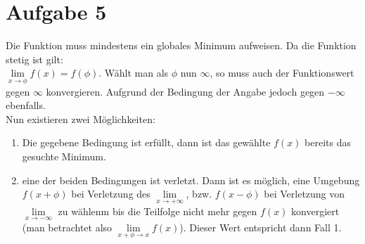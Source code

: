 \documentclass[11pt,a4paper]{article}
\begin{document}
  \section*{Aufgabe 5}

    Die Funktion muss mindestens ein globales Minimum aufweisen. Da die Funktion stetig ist gilt:\\
    $\lim\limits_{x \to \phi} f(x)=f(\phi)$. Wählt man als $\phi$ nun $\infty$, so muss auch der Funktionswert gegen $\infty$ konvergieren. Aufgrund der Bedingung der Angabe jedoch gegen $-\infty$ ebenfalls.\\
    Nun existieren zwei Möglichkeiten:
    \begin{enumerate}
      \item Die gegebene Bedingung ist erfüllt, dann ist das gewählte $f(x)$ bereits das gesuchte Minimum.
      \item eine der beiden Bedingungen ist verletzt. Dann ist es möglich, eine Umgebung $f(x+\phi)$ bei Verletzung des $\lim\limits_{x \to +\infty}$, bzw. $f(x-\phi)$ bei Verletzung von $\lim\limits_{x \to -\infty}$ zu wählenm bis die Teilfolge nicht mehr gegen $f(x)$ konvergiert (man betrachtet also $\lim\limits_{x+\phi \to x} f(x)$). Dieser Wert entspricht dann Fall 1.
    \end{enumerate}
\end{document}

